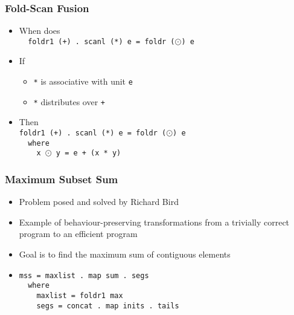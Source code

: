 \documentclass{beamer}
\begin{document}
\begin{frame}[fragile]
    \frametitle{Fold-Scan Fusion}

\begin{itemize}
    \item When does\\
        \verb?  foldr1 (+) . scanl (*) e = foldr (?$\odot$\verb?) e?\\
    \item If
        \begin{itemize}
            \item \verb?*? is associative with unit \verb?e?
            \item \verb?*? distributes over \verb?+?
        \end{itemize}
    \item Then \\
        \verb?foldr1 (+) . scanl (*) e = foldr (?$\odot$\verb?) e?\\
        \verb?  where ? \\
        \verb?    x ?$\odot$\verb? y = e + (x * y)?
\end{itemize}

\end{frame}

\begin{frame}[fragile]
    \frametitle{Maximum Subset Sum}

\begin{itemize}
    \item Problem posed and solved by Richard Bird
    \item Example of behaviour-preserving transformations from a trivially correct program to an efficient program
    \item Goal is to find the maximum sum of contiguous elements
    \item
    \verb?mss = maxlist . map sum . segs? \\
    \verb?  where? \\
    \verb?    maxlist = foldr1 max? \\
    \verb?    segs = concat . map inits . tails?
\end{itemize}

\end{frame}
\end{document}
